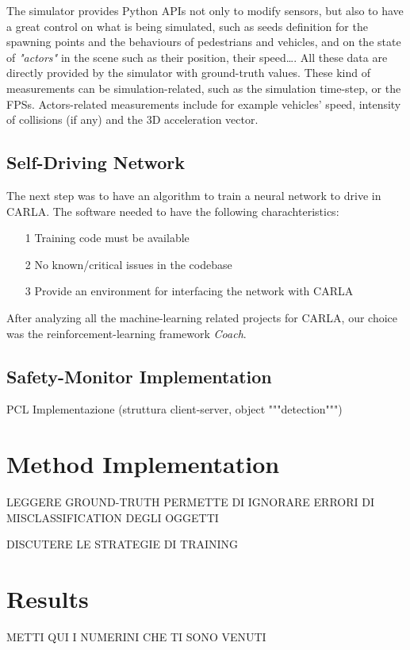 The simulator provides Python APIs not only to modify sensors, but also to have a great control on what is being simulated, such as seeds definition for the spawning points and the behaviours of pedestrians and vehicles, and on the state of \textsl{"actors"} in the scene such as their position, their speed\dots. All these data are directly provided by the simulator with ground-truth values. These kind of measurements can be simulation-related, such as the simulation time-step, or the FPSs. Actors-related measurements include for example vehicles' speed, intensity of collisions (if any) and the 3D acceleration vector.

\subsection{Self-Driving Network}

The next step was to have an algorithm to train a neural network to drive in CARLA. The software needed to have the following charachteristics:

\begin{itemize}
	\item[1] Training code must be available
	\item[2] No known/critical issues in the codebase
	\item[3] Provide an environment for interfacing the network with CARLA
\end{itemize}

After analyzing all the machine-learning related projects for CARLA, our choice was the reinforcement-learning framework \textsl{Coach}.\cite{coach}

\subsection{Safety-Monitor Implementation}

PCL
Implementazione (struttura client-server, object """detection""")

\section{Method Implementation}


LEGGERE GROUND-TRUTH PERMETTE DI IGNORARE ERRORI DI MISCLASSIFICATION DEGLI OGGETTI

DISCUTERE LE STRATEGIE DI TRAINING

\section{Results}

METTI QUI I NUMERINI CHE TI SONO VENUTI
